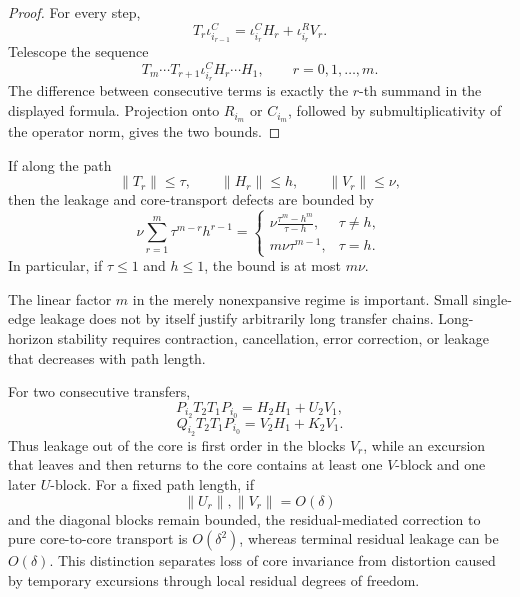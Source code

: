 \begin{proof}
For every step,
\[
T_r\iota_{i_{r-1}}^C
=
\iota_{i_r}^CH_r+
\iota_{i_r}^RV_r.
\]
Telescope the sequence
\[
T_m\cdots T_{r+1}\iota_{i_r}^C H_r\cdots H_1,
\qquad
r=0,1,\ldots,m.
\]
The difference between consecutive terms is exactly the \(r\)-th summand in
the displayed formula. Projection onto \(R_{i_m}\) or \(C_{i_m}\), followed
by submultiplicativity of the operator norm, gives the two bounds.
\end{proof}

\begin{SRWTcorollary}\label{SRWT:cor:uniform-path-bound}
If along the path
\[
\|T_r\|\leq\tau,
\qquad
\|H_r\|\leq h,
\qquad
\|V_r\|\leq\nu,
\]
then the leakage and core-transport defects are bounded by
\[
\boxed{
\nu\sum_{r=1}^{m}\tau^{m-r}h^{r-1}
=
\begin{cases}
\displaystyle
\nu\frac{\tau^m-h^m}{\tau-h},&\tau\neq h,\\[1.1em]
\displaystyle
m\nu\tau^{m-1},&\tau=h.
\end{cases}
}
\]
In particular, if \(\tau\leq1\) and \(h\leq1\), the bound is at most
\(m\nu\).
\end{SRWTcorollary}

The linear factor \(m\) in the merely nonexpansive regime is important. Small
single-edge leakage does not by itself justify arbitrarily long transfer
chains. Long-horizon stability requires contraction, cancellation, error
correction, or leakage that decreases with path length.


For two consecutive transfers,
\[
P_{i_2}T_2T_1P_{i_0}
=
H_2H_1+U_2V_1,
\]
\[
Q_{i_2}T_2T_1P_{i_0}
=
V_2H_1+K_2V_1.
\]
Thus leakage out of the core is first order in the blocks \(V_r\), while an
excursion that leaves and then returns to the core contains at least one
\(V\)-block and one later \(U\)-block. For a fixed path length, if
\[
\|U_r\|,\|V_r\|=O(\delta)
\]
and the diagonal blocks remain bounded, the residual-mediated correction to
pure core-to-core transport is \(O(\delta^2)\), whereas terminal residual
leakage can be \(O(\delta)\). This distinction separates loss of core
invariance from distortion caused by temporary excursions through local
residual degrees of freedom.


